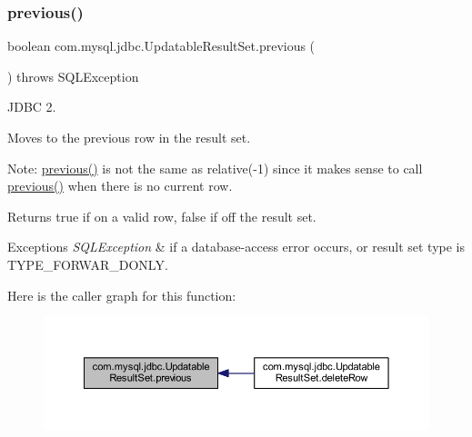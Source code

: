 \subsubsection{\texorpdfstring{previous()}{previous()}}
{\footnotesize\ttfamily boolean com.\+mysql.\+jdbc.\+Updatable\+Result\+Set.\+previous (\begin{DoxyParamCaption}{ }\end{DoxyParamCaption}) throws S\+Q\+L\+Exception}

J\+D\+BC 2.

Moves to the previous row in the result set. 

Note\+: \mbox{\hyperlink{classcom_1_1mysql_1_1jdbc_1_1_updatable_result_set_a8e765bdd7ae0094837a347f5f77486ce}{previous()}} is not the same as relative(-\/1) since it makes sense to call \mbox{\hyperlink{classcom_1_1mysql_1_1jdbc_1_1_updatable_result_set_a8e765bdd7ae0094837a347f5f77486ce}{previous()}} when there is no current row. 

\begin{DoxyReturn}{Returns}
true if on a valid row, false if off the result set.
\end{DoxyReturn}

\begin{DoxyExceptions}{Exceptions}
{\em S\+Q\+L\+Exception} & if a database-\/access error occurs, or result set type is T\+Y\+P\+E\+\_\+\+F\+O\+R\+W\+A\+R\+\_\+\+D\+O\+N\+LY. \\
\hline
\end{DoxyExceptions}
Here is the caller graph for this function\+:
\nopagebreak
\begin{figure}[H]
\begin{center}
\leavevmode
\includegraphics[width=350pt]{classcom_1_1mysql_1_1jdbc_1_1_updatable_result_set_a8e765bdd7ae0094837a347f5f77486ce_icgraph}
\end{center}
\end{figure}
\mbox{\label{classcom_1_1mysql_1_1jdbc_1_1_updatable_result_set_a56e7da4266eef885ba3dfc5005e30525}} 
